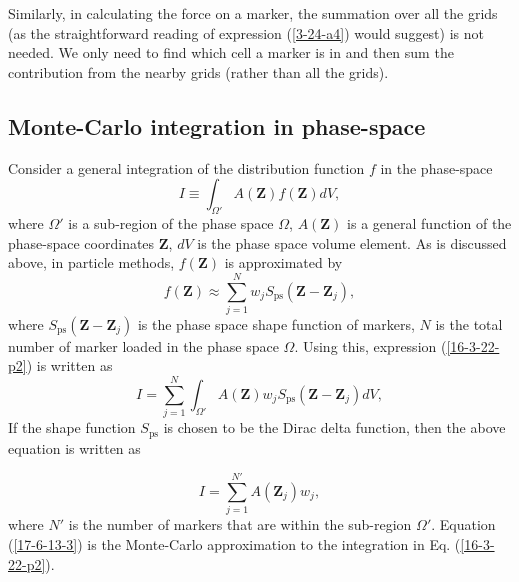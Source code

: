 \documentclass{article}
\newcommand{\tmop}[1]{\ensuremath{\operatorname{#1}}}
\begin{document}
Similarly, in calculating the force on a marker, the summation over all the
grids (as the straightforward reading of expression (\ref{3-24-a4}) would
suggest) is not needed. We only need to find which cell a marker is in and
then sum the contribution from the nearby grids (rather than all the grids).

\subsection{Monte-Carlo integration in phase-space}

Consider a general integration of the distribution function $f$ in the
phase-space
\begin{equation}
  \label{16-3-22-p2} I \equiv \int_{\Omega'} A (\mathbf{Z}) f (\mathbf{Z}) d
  V,
\end{equation}
where $\Omega'$ is a sub-region of the phase space $\Omega$, $A (\mathbf{Z})$
is a general function of the phase-space coordinates $\mathbf{Z}$, $d V$ is
the phase space volume element. As is discussed above, in particle methods, $f
(\mathbf{Z})$ is approximated by
\begin{equation}
  f (\mathbf{Z}) \approx \sum_{j = 1}^N w_j S_{\tmop{ps}}
  (\mathbf{Z}-\mathbf{Z}_j),
\end{equation}
where $S_{\tmop{ps}} (\mathbf{Z}-\mathbf{Z}_j)$ is the phase space shape
function of markers, $N$ is the total number of marker loaded in the phase
space $\Omega$. Using this, expression (\ref{16-3-22-p2}) is written as
\begin{equation}
  \label{17-7-17-p5} I = \sum_{j = 1}^N \int_{\Omega'} A (\mathbf{Z}) w_j
  S_{\tmop{ps}} (\mathbf{Z}-\mathbf{Z}_j) d V,
\end{equation}
If the shape function $S_{\tmop{ps}}$ is chosen to be the Dirac delta
function, then the above equation is written as


\begin{equation}
  \label{17-6-13-3} I = \sum_{j = 1}^{N'} A (\mathbf{Z}_j) w_j,
\end{equation}
where $N'$ is the number of markers that are within the sub-region $\Omega'$.
Equation (\ref{17-6-13-3}) is the Monte-Carlo approximation to the integration
in Eq. (\ref{16-3-22-p2}){\cite{Fitzpatrickcp,aydemir1994}}.
\end{document}
